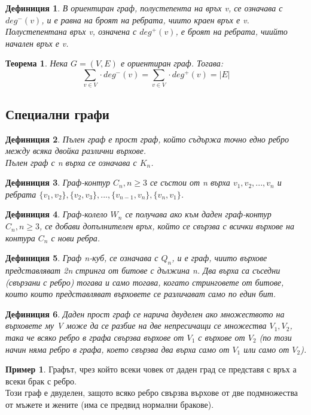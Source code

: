 \documentclass[fleqn, 12pt]{article}
\newtheorem{definition}{Дефиниция}[subsection]
\newtheorem{theorem}{Теорема}[subsection]
\theoremstyle{definition}
\newtheorem{example}{Пример}[subsection]
\begin{document}
\begin{definition}
В ориентиран граф, полустепента на връх v, се означава с $deg^- (v)$, и е равна на броят на ребрата, чиито краен връх е v.\\
Полустепентана връх v, означена с $deg^+ (v)$, е броят на ребрата, чиийто начален връх е v. 
\end{definition}

\begin{theorem}
Нека $G = (V, E)$ е ориентиран граф. Тогава: 
$$\sum_{v \in V} \cdot deg^- (v) = \sum_{v \in V} \cdot deg^+ (v) = \vert E \vert$$
\end{theorem}

\subsection{Специални графи}
\begin{definition}
Пълен граф е прост граф, който съдържа точно едно ребро между всяка двойка различни върхове.\\
Пълен граф с n върха се означава с $K_n$.
\end{definition}
\begin{definition}
Граф-контур $C_n, n \geq 3$ се състои от n върха $v_1, v_2, ..., v_n$ и ребрата $\{v_1, v_2\}, \{v_2, v_3\}, ..., \{v_{n-1}, v_n\}, \{v_n, v_1\}$.
\end{definition}
\begin{definition}
Граф-колело $W_n$ се получава ако към даден граф-контур $C_n, n \geq 3$, се добави допълнителен връх, който се свързва с всички върхове на контура $C_n$ с нови ребра. 
\end{definition}
\begin{definition}
Граф n-куб, се означава с $Q_n$, и е граф, чиито върхове представляват 2n стринга от битове с дължина n. Два върха са съседни (свързани с ребро) тогава и само тогава, когато стринговете от битове, които които представляват върховете се различават само по един бит.
\end{definition}
\begin{definition}
Даден прост граф се нарича двуделен ако множеството на върховете му V може да се разбие на две непресичащи се множества $V_1,V_2$, така че всяко ребро в графа свързва върхове от $V_1$ с върхове от $V_2$ (по този начин няма ребро в графа, което свързва два върха само от $V_1$ или само от $V_2$).
\end{definition}
\begin{example}
Графът, чрез който всеки човек от даден град се представя с връх а всеки брак с ребро. \\
Този граф е двуделен, защото всяко ребро свързва върхове от две подмножества от мъжете и жените (има се предвид нормални бракове).
\end{example}
\end{document}
